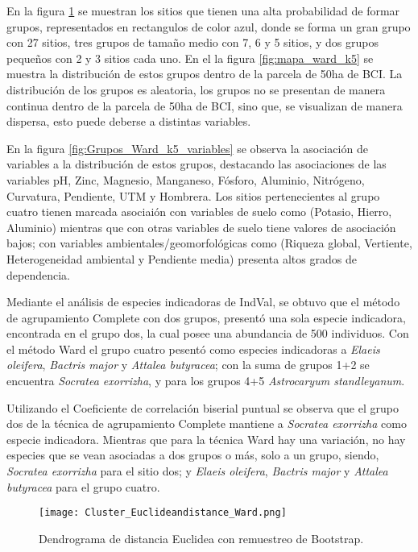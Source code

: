 \documentclass[11pt,]{article}
\begin{document}
En la figura \ref{fig:Cluster_Euclideandistance_Ward} se muestran los
sitios que tienen una alta probabilidad de formar grupos, representados
en rectangulos de color azul, donde se forma un gran grupo con 27
sitios, tres grupos de tamaño medio con 7, 6 y 5 sitios, y dos grupos
pequeños con 2 y 3 sitios cada uno. En el la figura
\ref{fig:mapa_ward_k5} se muestra la distribución de estos grupos dentro
de la parcela de 50ha de BCI. La distribución de los grupos es
aleatoria, los grupos no se presentan de manera continua dentro de la
parcela de 50ha de BCI, sino que, se visualizan de manera dispersa, esto
puede deberse a distintas variables.

En la figura \ref{fig:Grupos_Ward_k5_variables} se observa la asociación
de variables a la distribución de estos grupos, destacando las
asociaciones de las variables pH, Zinc, Magnesio, Manganeso, Fósforo,
Aluminio, Nitrógeno, Curvatura, Pendiente, UTM y Hombrera. Los sitios
pertenecientes al grupo cuatro tienen marcada asociaión con variables de
suelo como (Potasio, Hierro, Aluminio) mientras que con otras variables
de suelo tiene valores de asociación bajos; con variables
ambientales/geomorfológicas como (Riqueza global, Vertiente,
Heterogeneidad ambiental y Pendiente media) presenta altos grados de
dependencia.

Mediante el análisis de especies indicadoras de IndVal, se obtuvo que el
método de agrupamiento Complete con dos grupos, presentó una sola
especie indicadora, encontrada en el grupo dos, la cual posee una
abundancia de 500 individuos. Con el método Ward el grupo cuatro pesentó
como especies indicadoras a \emph{Elaeis oleifera}, \emph{Bactris major}
y \emph{Attalea butyracea}; con la suma de grupos 1+2 se encuentra
\emph{Socratea exorrizha}, y para los grupos 4+5 \emph{Astrocaryum
standleyanum}.

Utilizando el Coeficiente de correlación biserial puntual se observa que
el grupo dos de la técnica de agrupamiento Complete mantiene a
\emph{Socratea exorrizha} como especie indicadora. Mientras que para la
técnica Ward hay una variación, no hay especies que se vean asociadas a
dos grupos o más, solo a un grupo, siendo, \emph{Socratea exorrizha}
para el sitio dos; y \emph{Elaeis oleifera}, \emph{Bactris major} y
\emph{Attalea butyracea} para el grupo cuatro.

\begin{figure}
\centering
\texttt{[image: Cluster\_Euclideandistance\_Ward.png]}
\caption{Dendrograma de distancia Euclidea con remuestreo de Bootstrap.
\label{fig:Cluster_Euclideandistance_Ward}}
\end{figure}
\end{document}
